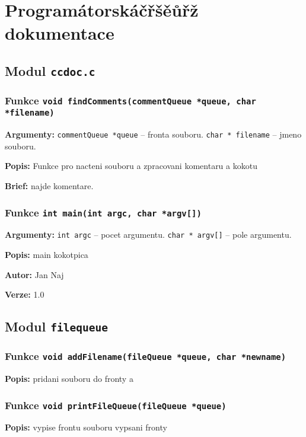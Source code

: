 \documentclass[12pt, a4paper]{article}
\begin{document}
\section{Programátorskáčřšěůřž dokumentace}
\subsection{Modul \texttt{ccdoc.c}}
\subsubsection{Funkce \texttt{void findComments(commentQueue *queue, char *filename)}}
\textbf{Argumenty: }\verb"commentQueue *queue" -- fronta souboru. \verb"char * filename" -- jmeno souboru. \\
\par\noindent
\textbf{Popis: }Funkce pro nacteni souboru a zpracovani komentaru a kokotu\\
\par\noindent
\textbf{Brief: } najde komentare.\\
\par\noindent
\subsubsection{Funkce \texttt{int main(int argc, char *argv[])}}
\textbf{Argumenty: }\verb"int argc" -- pocet argumentu. \verb"char * argv[]" -- pole argumentu. \\
\par\noindent
\textbf{Popis: }main kokotpica\\
\par\noindent
\textbf{Autor: } \textcopyright{} Jan Naj\\
\par\noindent
\textbf{Verze: } 1.0\\
\par\noindent
\subsection{Modul \texttt{filequeue}}
\subsubsection{Funkce \texttt{void addFilename(fileQueue *queue, char *newname)}}
\textbf{Popis: }pridani souboru do fronty a\\
\par\noindent
\subsubsection{Funkce \texttt{void printFileQueue(fileQueue *queue)}}
\textbf{Popis: }vypise frontu souboru vypsani fronty\\
\par\noindent
\end{document}
